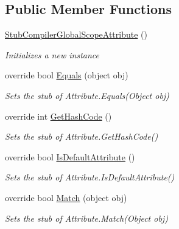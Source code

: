 \subsection*{Public Member Functions}
\begin{DoxyCompactItemize}
\item 
\hyperlink{class_system_1_1_runtime_1_1_compiler_services_1_1_fakes_1_1_stub_compiler_global_scope_attribute_aa7d7386424fac7cdf43ada5d53baf79e}{Stub\-Compiler\-Global\-Scope\-Attribute} ()
\begin{DoxyCompactList}\small\item\em Initializes a new instance\end{DoxyCompactList}\item 
override bool \hyperlink{class_system_1_1_runtime_1_1_compiler_services_1_1_fakes_1_1_stub_compiler_global_scope_attribute_a0dbc464141eca0da70e1e68e9837cbe6}{Equals} (object obj)
\begin{DoxyCompactList}\small\item\em Sets the stub of Attribute.\-Equals(\-Object obj)\end{DoxyCompactList}\item 
override int \hyperlink{class_system_1_1_runtime_1_1_compiler_services_1_1_fakes_1_1_stub_compiler_global_scope_attribute_a887ad961956acc30154d6ede11f4c52b}{Get\-Hash\-Code} ()
\begin{DoxyCompactList}\small\item\em Sets the stub of Attribute.\-Get\-Hash\-Code()\end{DoxyCompactList}\item 
override bool \hyperlink{class_system_1_1_runtime_1_1_compiler_services_1_1_fakes_1_1_stub_compiler_global_scope_attribute_a7086e9e4e2987b0a7ab91fe92d9ab099}{Is\-Default\-Attribute} ()
\begin{DoxyCompactList}\small\item\em Sets the stub of Attribute.\-Is\-Default\-Attribute()\end{DoxyCompactList}\item 
override bool \hyperlink{class_system_1_1_runtime_1_1_compiler_services_1_1_fakes_1_1_stub_compiler_global_scope_attribute_a5e740f251f21085fc1c4f18b0cdf6bdc}{Match} (object obj)
\begin{DoxyCompactList}\small\item\em Sets the stub of Attribute.\-Match(\-Object obj)\end{DoxyCompactList}\end{DoxyCompactItemize}
